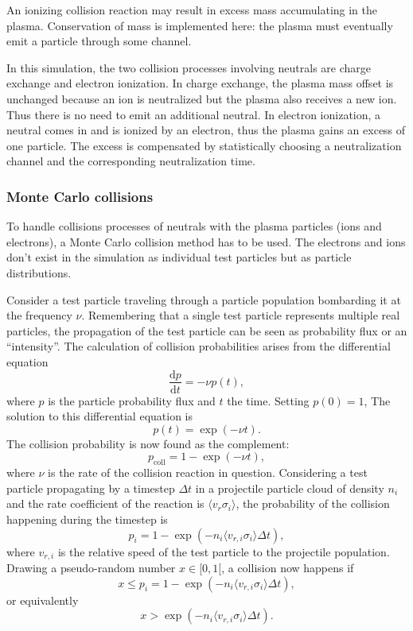 \documentclass[a4paper,twoside,12pt]{article}
\begin{document}
An ionizing collision reaction may result in excess mass accumulating in the plasma. Conservation of mass is implemented here: the plasma must eventually emit a particle through some channel.

In this simulation, the two collision processes involving neutrals are charge exchange and electron ionization. In charge exchange, the plasma mass offset is unchanged because an ion is neutralized but the plasma also receives a new ion. Thus there is no need to emit an additional neutral. In electron ionization, a neutral comes in and is ionized by an electron, thus the plasma gains an excess of one particle. The excess is compensated by statistically choosing a neutralization channel and the corresponding neutralization time.

\subsubsection{Monte Carlo collisions}
To handle collisions processes of neutrals with the plasma particles (ions and electrons), a Monte Carlo collision method has to be used. The electrons and ions don't exist in the simulation as individual test particles but as particle distributions.

Consider a test particle traveling through a particle population bombarding it at the frequency $\nu$. Remembering that a single test particle represents multiple real particles, the propagation of the test particle can be seen as probability flux or an ``intensity''. The calculation of collision probabilities arises from the differential equation
\begin{equation}
    \frac{\mathrm{d}p}{\mathrm{d}t} = -\nu p(t),
\end{equation}
where $p$ is the particle probability flux and $t$ the time. Setting $p(0) = 1$, The solution to this differential equation is
\[
    p(t) = \exp(-\nu t).
\]
The collision probability is now found as the complement:
\begin{equation}
    p_\text{coll} = 1 - \exp(-\nu t),
\end{equation}
where $\nu$ is the rate of the collision reaction in question. Considering a test particle propagating by a timestep $\Delta t$ in a projectile particle cloud of density $n_i$ and the rate coefficient of the reaction is $\langle v_r \sigma_i \rangle$, the probability of the collision happening during the timestep is
\begin{equation}
    p_i = 1 - \exp(-n_i \langle v_{r, i} \sigma_i \rangle \Delta t),
\end{equation}
where $v_{r, i}$ is the relative speed of the test particle to the projectile population. Drawing a pseudo-random number $x \in [0, 1[$, a collision now happens if
\[
    x \leq p_i = 1 - \exp(-n_i \langle v_{r, i} \sigma_i \rangle \Delta t),
\]
or equivalently
\[
    x > \exp(-n_i \langle v_{r, i} \sigma_i \rangle \Delta t).
\]
\end{document}
